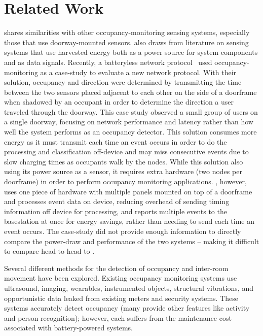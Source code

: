 \section{Related Work}
\label{sec:related}

\sysname shares similarities with other occupancy-monitoring sensing systems, especially those that use doorway-mounted sensors. 
\sysname also draws from literature on sensing systems that use harvested energy both as a power source for system components and as data signals. 
Recently, a batteryless network protocol~\cite{geissdoerfer2022learning} used occupancy-monitoring as a case-study to evaluate a new network protocol.
With their solution, occupancy and direction were determined by transmitting the time between the two sensors placed adjacent to each other on the side of a doorframe when shadowed by an occupant in order to determine the direction a user traveled through the doorway.
This case study observed a small group of users on a single doorway, focusing on network performance and latency rather than how well the system performs as an occupancy detector.
This solution consumes more energy as it must transmit each time an event occurs in order to do the processing and classification off-device and may miss consecutive events due to slow charging times as occupants walk by the nodes. While this solution also using its power source as a sensor, it requires extra hardware (two nodes per doorframe) in order to perform occupancy monitoring applications. \sysname, however, uses one piece of hardware with multiple panels mounted on
top of a doorframe and processes event data on device, reducing overhead of sending timing information off device for processing, and reports multiple events to the basestation at once for energy savings, rather than needing to send each time an event occurs.  
The case-study did not provide enough information to directly compare the power-draw and performance of the two systems -- making it difficult to compare head-to-head to \sysname.  


Several different methods for the detection of occupancy and inter-room movement have been explored. 
Existing occupancy monitoring systems use ultrasound\cite{hnat2012doorjamb}, imaging\cite{tyndall2016occupancy, teixeira2007lightweight}, wearables\cite{fishkin2005hands}, instrumented objects\cite{buettner2009activity}, structural vibrations\cite{pan2016occupant}, and opportunistic data leaked from existing meters and security systems\cite{yangoccupancy2014}.
These systems accurately detect occupancy (many provide other features like activity and person recognition); however, each suffers from the maintenance cost associated with battery-powered systems.

